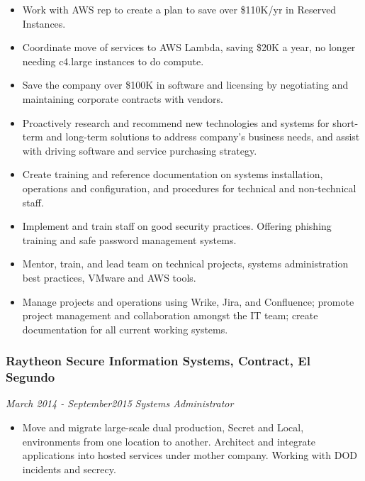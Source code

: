 \documentclass[]{article}
\providecommand{\tightlist}{%
  \setlength{\itemsep}{0pt}\setlength{\parskip}{0pt}}
\begin{document}
\begin{itemize}
\tightlist
\item
  Work with AWS rep to create a plan to save over \$110K/yr in Reserved
  Instances.
\item
  Coordinate move of services to AWS Lambda, saving \$20K a year, no
  longer needing c4.large instances to do compute.
\item
  Save the company over \$100K in software and licensing by negotiating
  and maintaining corporate contracts with vendors.
\item
  Proactively research and recommend new technologies and systems for
  short-term and long-term solutions to address company's business
  needs, and assist with driving software and service purchasing
  strategy.
\item
  Create training and reference documentation on systems installation,
  operations and configuration, and procedures for technical and
  non-technical staff.
\item
  Implement and train staff on good security practices. Offering
  phishing training and safe password management systems.
\item
  Mentor, train, and lead team on technical projects, systems
  administration best practices, VMware and AWS tools.
\item
  Manage projects and operations using Wrike, Jira, and Confluence;
  promote project management and collaboration amongst the IT team;
  create documentation for all current working systems.
\end{itemize}

\hypertarget{raytheon-secure-information-systems-contract-el-segundo}{%
\subsubsection{Raytheon Secure Information Systems, Contract, El
Segundo}\label{raytheon-secure-information-systems-contract-el-segundo}}

\emph{March 2014 - September2015} \emph{Systems Administrator}

\begin{itemize}
\tightlist
\item
  Move and migrate large-scale dual production, Secret and Local,
  environments from one location to another. Architect and integrate
  applications into hosted services under mother company. Working with
  DOD incidents and secrecy.
\end{itemize}
\end{document}
